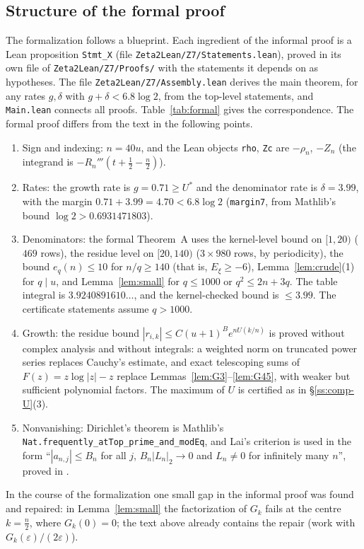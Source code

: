 \documentclass{amsart}
\theoremstyle{definition}
\theoremstyle{remark}
\numberwithin{equation}{section}
\begin{document}
\subsection{Structure of the formal proof}\label{ss:formal-structure}

\sloppy
The formalization follows a blueprint. Each ingredient of the informal proof
is a Lean proposition \texttt{Stmt\_X} (file \texttt{Zeta2Lean/Z7/Statements.lean}),
proved in its own file of \texttt{Zeta2Lean/Z7/Proofs/} with the statements it
depends on as hypotheses. The file \texttt{Zeta2Lean/Z7/Assembly.lean} derives
the main theorem, for any rates $g,\delta$ with $g+\delta<6.8\log2$, from the
top-level statements, and \texttt{Main.lean} connects all proofs.
Table~\ref{tab:formal} gives the correspondence. The formal proof differs from
the text in the following points.
\begin{enumerate}
\item[(1)] Sign and indexing: $n=40u$, and the Lean objects \texttt{rho},
  \texttt{Zc} are $-\rho_n$, $-Z_n$ (the integrand is
  $-R_n'''(t+\frac12-\frac n2)$).
\item[(2)] Rates: the growth rate is $g=0.71\ge U^*$ and the denominator rate
  is $\delta=3.99$, with the margin $0.71+3.99=4.70<6.8\log2$
  (\texttt{margin7}, from Mathlib's bound $\log2>0.6931471803$).
\item[(3)] Denominators: the formal Theorem~A uses the kernel-level bound on
  $[1,20)$ ($469$ rows), the residue level on $[20,140)$ ($3\times980$ rows,
  by periodicity), the bound $e_q(n)\le10$ for $n/q\ge140$ (that is,
  $E_\xi\ge-6$), Lemma~\ref{lem:crude}(1) for $q\mid u$, and
  Lemma~\ref{lem:small} for $q\le1000$ or $q^2\le2n+3q$. The table integral
  is $3.9240891610\ldots$, and the kernel-checked bound is $\le3.99$. The
  certificate statements assume $q>1000$.
\item[(4)] Growth: the residue bound $|r_{i,k}|\le C(u+1)^Be^{nU(k/n)}$ is
  proved without complex analysis and without integrals: a weighted norm on
  truncated power series replaces Cauchy's estimate, and exact telescoping
  sums of $F(z)=z\log|z|-z$ replace Lemmas~\ref{lem:G3}--\ref{lem:G45}, with
  weaker but sufficient polynomial factors. The maximum of $U$ is certified as
  in \S\ref{ss:comp-U}(3).
\item[(5)] Nonvanishing: Dirichlet's theorem is Mathlib's
  \texttt{Nat.frequently\_\allowbreak atTop\_\allowbreak prime\_\allowbreak and\_\allowbreak modEq}, and Lai's criterion is
  used in the form ``$|a_{n,j}|\le B_n$ for all $j$, $B_n|L_n|_2\to0$ and
  $L_n\ne0$ for infinitely many $n$'', proved in \cite{DevPair26}.
\end{enumerate}
In the course of the formalization one small gap in the informal proof was
found and repaired: in Lemma~\ref{lem:small} the factorization of $G_k$ fails
at the centre $k=\frac n2$, where $G_k(0)=0$; the text above already contains
the repair (work with $G_k(\varepsilon)/(2\varepsilon)$).
\end{document}
